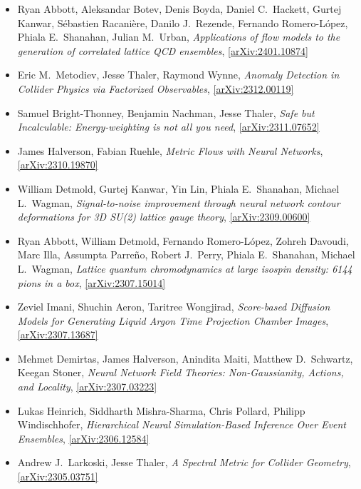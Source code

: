 \begin{itemize}
\item Ryan Abbott, Aleksandar Botev, Denis Boyda, Daniel C.\  Hackett, Gurtej Kanwar, Sébastien Racanière, Danilo J.\  Rezende, Fernando Romero-López, Phiala E.\  Shanahan, Julian M.\  Urban, \textit{Applications of flow models to the generation of correlated lattice QCD ensembles}, \href{https://arxiv.org/abs/2401.10874}{[arXiv:2401.10874]} 
\item Eric M.\  Metodiev, Jesse Thaler, Raymond Wynne, \textit{Anomaly Detection in Collider Physics via Factorized Observables}, \href{https://arxiv.org/abs/2312.00119}{[arXiv:2312.00119]} 
\item Samuel Bright-Thonney, Benjamin Nachman, Jesse Thaler, \textit{Safe but Incalculable: Energy-weighting is not all you need}, \href{https://arxiv.org/abs/2311.07652}{[arXiv:2311.07652]} 
\item James Halverson, Fabian Ruehle, \textit{Metric Flows with Neural Networks}, \href{https://arxiv.org/abs/2310.19870}{[arXiv:2310.19870]} 
\item William Detmold, Gurtej Kanwar, Yin Lin, Phiala E.\  Shanahan, Michael L.\  Wagman, \textit{Signal-to-noise improvement through neural network contour deformations for 3D SU(2) lattice gauge theory}, \href{https://arxiv.org/abs/2309.00600}{[arXiv:2309.00600]} 
\item Ryan Abbott, William Detmold, Fernando Romero-López, Zohreh Davoudi, Marc Illa, Assumpta Parreño, Robert J.\  Perry, Phiala E.\  Shanahan, Michael L.\  Wagman, \textit{Lattice quantum chromodynamics at large isospin density: 6144 pions in a box}, \href{https://arxiv.org/abs/2307.15014}{[arXiv:2307.15014]} 
\item Zeviel Imani, Shuchin Aeron, Taritree Wongjirad, \textit{Score-based Diffusion Models for Generating Liquid Argon Time Projection Chamber Images}, \href{https://arxiv.org/abs/2307.13687}{[arXiv:2307.13687]} 
\item Mehmet Demirtas, James Halverson, Anindita Maiti, Matthew D.\  Schwartz, Keegan Stoner, \textit{Neural Network Field Theories: Non-Gaussianity, Actions, and Locality}, \href{https://arxiv.org/abs/2307.03223}{[arXiv:2307.03223]} 
\item Lukas Heinrich, Siddharth Mishra-Sharma, Chris Pollard, Philipp Windischhofer, \textit{Hierarchical Neural Simulation-Based Inference Over Event Ensembles}, \href{https://arxiv.org/abs/2306.12584}{[arXiv:2306.12584]} 
\item Andrew J.\  Larkoski, Jesse Thaler, \textit{A Spectral Metric for Collider Geometry}, \href{https://arxiv.org/abs/2305.03751}{[arXiv:2305.03751]} 

\end{itemize}
